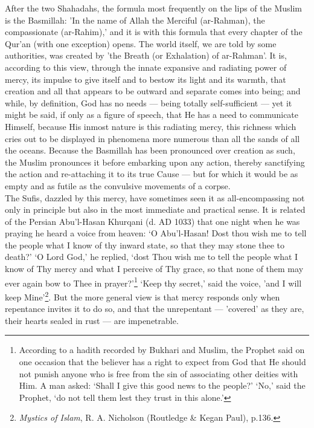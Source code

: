\documentclass[10pt, twoside,openright]{book}
\begin{document}
After the two Shahadahs, the formula most frequently on the lips of the Muslim is the Basmillah: 'In 
the name of Allah the Merciful (ar\hyp{}Rahman), the compassionate (ar\hyp{}Rahim),' and it is with this 
formula that every chapter of the Qur'an (with one exception) opens. The world itself, we are told by 
some authorities, was created by 'the Breath (or Exhalation) of ar\hyp{}Rahman'. It is, according to this 
view, through the innate expansive and radiating power of mercy, its impulse to give itself and to 
bestow its light and its warmth, that creation and all that appears to be outward and separate comes 
into being; and while, by definition, God has no needs --- being totally self-sufficient --- yet it might 
be said, if only as a figure of speech, that He has a need to communicate Himself, because His inmost 
nature is this radiating mercy, this richness which cries out to be displayed in phenomena more 
numerous than all the sands of all the oceans. Because the Basmillah has been pronounced over 
creation as such, the Muslim pronounces it before embarking upon any action, thereby sanctifying the 
action and re-attaching it to its true Cause --- but for which it would be as empty and as futile as 
the convulsive movements of a corpse. \\

The Sufis, dazzled by this mercy, have sometimes seen it as all\hyp{}encompassing not only in principle 
but also in the most immediate and practical sense. It is related of the Persian Abu'l\hyp{}Hasan Khurqani 
(d. AD 1033) that one night when he was praying he heard a voice from heaven: `O Abu'l\hyp{}Hasan! Dost 
thou wish me to tell the people what I know of thy inward state, so that they may stone thee to 
death?' `O Lord God,' he replied, `dost Thou wish me to tell the people what I know of Thy mercy and 
what I perceive of Thy grace, so that none of them may ever again bow to Thee in prayer?'\footnote{According to a hadith recorded by Bukhari and Muslim, the Prophet said on one occasion that the believer has a right to expect from God that He should not punish anyone who is free from the sin of associating other deities with Him. A man asked: `Shall I give this good news to the people?' `No,' 
said the Prophet, `do not tell them lest they trust in this alone.'} `Keep thy secret,' said the voice, 'and I will keep Mine'\footnote{\emph{Mystics of Islam}, R. A. Nicholson (Routledge \& Kegan Paul), p.136.}. But the more general view is that mercy responds only when repentance invites it to do so, and that the unrepentant --- 'covered' as they are, their hearts sealed in rust --- are impenetrable. \\
\end{document}
